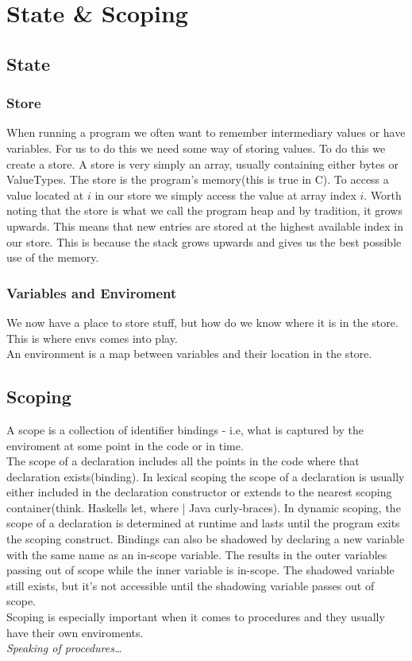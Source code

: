 \documentclass{article}
\begin{document}
    \section{State \& Scoping}
        \subsection{State}
        \subsubsection{Store}
        When running a program we often want to remember intermediary values or have variables. For us to do this we need some way of storing values.
        To do this we create a \gls{store}. A store is very simply an array, usually containing either bytes or ValueTypes. 
        The store is the program's memory(this is true in C). To access a value located at $i$ in our store we simply access the value at array index $i$.
        Worth noting that the store is what we call the program heap and by tradition, it grows upwards. This means that new entries are stored at the highest available index in our store.
        This is because the stack grows upwards and gives us the best possible use of the memory.
        \subsubsection{Variables and Enviroment}
        We now have a place to store stuff, but how do we know where it is in the store. This is where \glspl{env} comes into play.\\
        An environment is a map between variables and their location in the store. 
        \subsection{Scoping}
        A \gls{scope} is a collection of identifier bindings - i.e, what is captured by the enviroment at some point in the code or in time.\\
        The scope of a declaration includes all the points in the code where that declaration exists(binding). In lexical scoping the
        scope of a declaration is usually either included in the declaration constructor or extends to the nearest scoping container(think. Haskells let, where | Java curly-braces).
        In dynamic scoping, the scope of a declaration is determined at runtime and lasts until the program exits the scoping construct.
        Bindings can also be shadowed by declaring a new variable with the same name as an in-scope variable. 
        The results in the outer variables passing out of scope while the inner variable is in-scope.
        The shadowed variable still exists, but it's not accessible until the shadowing variable passes out of scope.\\
        Scoping is especially important when it comes to procedures and they usually have their own enviroments.\\
        \textit{Speaking of procedures\dots}
\end{document}
